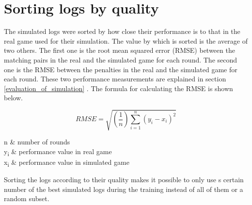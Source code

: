 \section{Sorting logs by quality}
\label{sorting_logs_by_quality}
The simulated logs were sorted by how close their performance is to that in the real game used for their simulation. The value by which is sorted is the average of two others. The first one is the root mean squared error (RMSE) between the matching pairs in the real and the simulated game for each round. The second one is the RMSE between the penalties in the real and the simulated game for each round. These two performance measurements are explained in section \ref{evaluation_of_simulation} . The formula for calculating the RMSE is shown below. 

\begin{minipage}{0.45\textwidth}
	\begin{equation*}
	RMSE = \sqrt{(\frac{1}{n})\sum_{i=1}^{n}(y_{i} - x_{i})^{2}}
	\end{equation*}
\end{minipage}
\begin{minipage}{0.55\textwidth}
	\begin{conditions*}
		n  &  number of rounds \\
		y\textsubscript{i}  &  performance value in real game\\
		x\textsubscript{i}  &  performance value in simulated game 
	\end{conditions*}
\end{minipage}

Sorting the logs according to their quality makes it possible to only use s certain number of the best simulated logs during the training instead of all of them or a random subset. 

\newpage 

